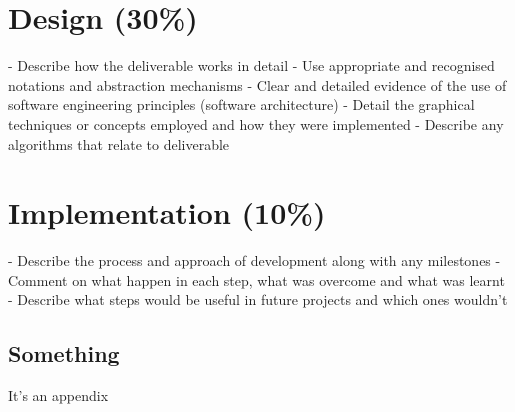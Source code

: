 \documentclass[11pt, a4paper]{article}
\begin{document}
\section{Design (30\%)}

- Describe how the deliverable works in detail
- Use appropriate and recognised notations and abstraction mechanisms
- Clear and detailed evidence of the use of software engineering principles (software architecture)
- Detail the graphical techniques or concepts employed and how they were implemented
- Describe any algorithms that relate to deliverable

\section{Implementation (10\%)}

- Describe the process and approach of development along with any milestones
- Comment on what happen in each step, what was overcome and what was learnt
- Describe what steps would be useful in future projects and which ones wouldn't

\cleardoublepage
\printbibliography[
  heading=bibintoc,
  title={Bibliography}
]

\cleardoublepage
\begin{appendices}

\section{Something}

It's an appendix

\end{appendices}
\end{document}
